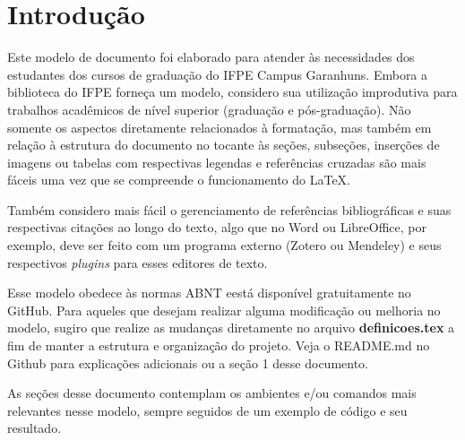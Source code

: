 \chapter{Introdução}\label{ch:intro}
Este modelo de documento foi elaborado para atender às necessidades dos estudantes dos cursos de graduação do IFPE Campus Garanhuns.
Embora a biblioteca do IFPE forneça um modelo, considero sua utilização improdutiva para trabalhos acadêmicos de nível superior (graduação e pós-graduação). Não somente os aspectos diretamente relacionados à formatação, mas também em relação à estrutura do documento no tocante às seções, subseções, inserções de imagens ou tabelas com respectivas legendas e referências cruzadas são mais fáceis uma vez que se compreende o funcionamento do \LaTeX.

Também considero mais fácil o gerenciamento de referências bibliográficas e suas respectivas citações ao longo do texto, algo que no Word ou LibreOffice, por exemplo, deve ser feito com um programa externo (Zotero ou Mendeley) e seus respectivos \textit{plugins} para esses editores de texto.

Esse modelo obedece às normas ABNT eestá disponível gratuitamente no GitHub. Para aqueles que desejam realizar alguma modificação ou melhoria no modelo, sugiro que realize as mudanças diretamente no arquivo \textbf{definicoes.tex} a fim de manter a estrutura e organização do projeto. Veja o README.md no Github para explicações adicionais ou a seção 1 desse documento.

As seções desse documento contemplam os ambientes e/ou comandos mais relevantes nesse modelo, sempre seguidos de um exemplo de código e seu resultado.